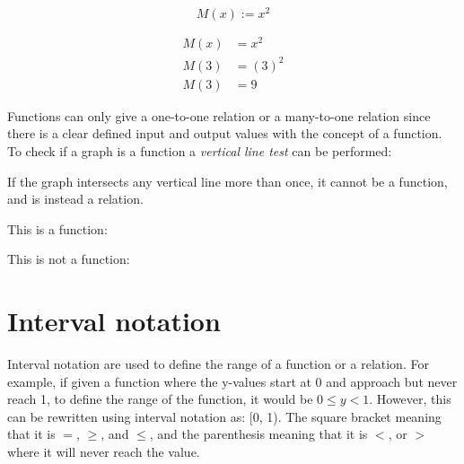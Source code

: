 \documentclass{book}
\begin{document}
\[
	M(x) := x^2
\]

\begin{align*}
	M(x) & = x^2   \\
	M(3) & = (3)^2 \\
	M(3) & = 9
\end{align*}

Functions can only give a one-to-one relation or a many-to-one relation since there is a clear defined input and output values with the concept of a function.  To check if a graph is a function a \emph{vertical line test} can be performed:

\begin{center}
	If the graph intersects any vertical line more than once, it cannot be a function, and is instead a relation.
\end{center}

\begin{center}
	This is a function:
	\begin{center}
	\end{center}
\end{center}

\begin{center}
	This is not a function:
	\begin{center}
	\end{center}
\end{center}



\section{Interval notation}
Interval notation are used to define the range of a function or a relation.  For example, if given a function where the y-values start at 0 and approach but never reach 1, to define the range of the function, it would be $0 \leq y < 1$.  However, this can be rewritten using interval notation as: [0, 1).  The square bracket meaning that it is $=$, $\geq$, and $\leq$, and the parenthesis meaning that it is $<$, or $>$ where it will never reach the value.
\end{document}
